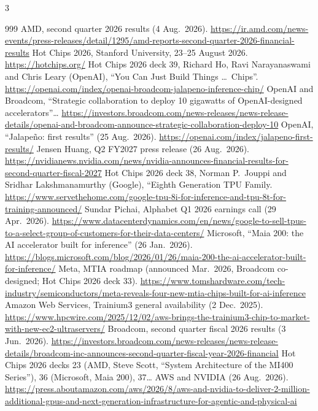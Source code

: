 \begin{multicols}{3}
\begin{thebibliography}{999}
 AMD, second quarter 2026 results (4 Aug.\ 2026). \url{https://ir.amd.com/news-events/press-releases/detail/1295/amd-reports-second-quarter-2026-financial-results}
 Hot Chips 2026, Stanford University, 23--25 August 2026. \url{https://hotchips.org/}
 Hot Chips 2026 deck 39, Richard Ho, Ravi Narayanaswami and Chris Leary (OpenAI), ``You Can Just Build Things \ldots\ Chips''. \url{https://openai.com/index/openai-broadcom-jalapeno-inference-chip/}
 OpenAI and Broadcom, ``Strategic collaboration to deploy 10 gigawatts of OpenAI-designed accelerators''… \url{https://investors.broadcom.com/news-releases/news-release-details/openai-and-broadcom-announce-strategic-collaboration-deploy-10}
 OpenAI, ``Jalape\~no: first results'' (25 Aug.\ 2026). \url{https://openai.com/index/jalapeno-first-results/}
 Jensen Huang, Q2 FY2027 press release (26 Aug.\ 2026). \url{https://nvidianews.nvidia.com/news/nvidia-announces-financial-results-for-second-quarter-fiscal-2027}
 Hot Chips 2026 deck 38, Norman P.\ Jouppi and Sridhar Lakshmanamurthy (Google), ``Eighth Generation TPU Family. \url{https://www.servethehome.com/google-tpu-8i-for-inference-and-tpu-8t-for-training-announced/}
 Sundar Pichai, Alphabet Q1 2026 earnings call (29 Apr.\ 2026). \url{https://www.datacenterdynamics.com/en/news/google-to-sell-tpus-to-a-select-group-of-customers-for-their-data-centers/}
 Microsoft, ``Maia 200: the AI accelerator built for inference'' (26 Jan.\ 2026). \url{https://blogs.microsoft.com/blog/2026/01/26/maia-200-the-ai-accelerator-built-for-inference/}
 Meta, MTIA roadmap (announced Mar.\ 2026, Broadcom co-designed; Hot Chips 2026 deck 33). \url{https://www.tomshardware.com/tech-industry/semiconductors/meta-reveals-four-new-mtia-chips-built-for-ai-inference}
 Amazon Web Services, Trainium3 general availability (2 Dec.\ 2025). \url{https://www.hpcwire.com/2025/12/02/aws-brings-the-trainium3-chip-to-market-with-new-ec2-ultraservers/}
 Broadcom, second quarter fiscal 2026 results (3 Jun.\ 2026). \url{https://investors.broadcom.com/news-releases/news-release-details/broadcom-inc-announces-second-quarter-fiscal-year-2026-financial}
 Hot Chips 2026 decks 23 (AMD, Steve Scott, ``System Architecture of the MI400 Series''), 36 (Microsoft, Maia 200), 37…
 AWS and NVIDIA (26 Aug.\ 2026). \url{https://press.aboutamazon.com/aws/2026/8/aws-and-nvidia-to-deliver-2-million-additional-gpus-and-next-generation-infrastructure-for-agentic-and-physical-ai}

\end{thebibliography}
\end{multicols}
